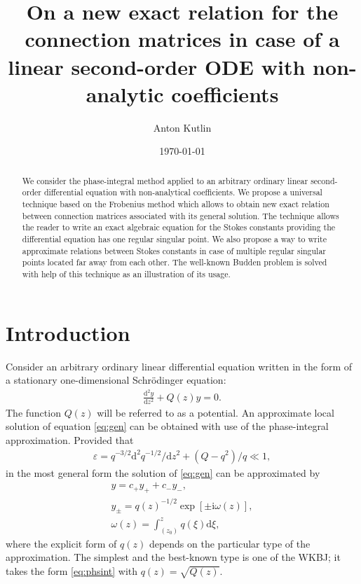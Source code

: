\documentclass[aip,jmp,reprint]{revtex4-1}
\def\rmi{\mathrm{i}}
\def\rmd{\mathrm{d}}
\def\w{\omega}
\newcommand\phsintgrnd[1][z]{q(#1)}
\newcommand\predexp[1][z]{q(#1)^{-1/2}}
\newcommand\phsintgrl[3][z]{\int_{#2}^{#3} \phsintgrnd[#1] \rmd #1}
\begin{document}
\title{On a new exact relation for the connection matrices in case of 
a linear second-order ODE with non-analytic coefficients}
\author{Anton Kutlin}

\date{\today}

\begin{abstract}
We consider the phase-integral method applied to an arbitrary ordinary linear second-order differential 
equation with non-analytical coefficients. We propose a universal technique based on the Frobenius method 
which allows to obtain new exact relation between connection matrices associated with its general solution.
The technique allows the reader to write an exact algebraic equation for the Stokes constants providing 
the differential equation has one regular singular point. We also propose a way to write approximate relations 
between Stokes constants in case of multiple regular singular points located far away from each other.
The well-known Budden problem is solved with help of this technique as an illustration of its usage.
\end{abstract}


\maketitle

\section{Introduction \label{sec:intro}}
Consider an arbitrary ordinary linear differential equation written in the form of 
a stationary one-dimensional Schr\"odinger equation:
\begin{eqnarray}
\frac{\rmd^2 y}{\rmd z^2} + Q(z)y = 0.   \label{eq:gen}
\end{eqnarray}
The function $Q(z)$ will be referred to as a potential. An approximate local solution 
of equation \eqref{eq:gen} can be obtained with use of the phase-integral approximation\cite{frbook}. 
Provided that 
\begin{eqnarray}
\varepsilon = q^{-3/2} \rmd^2 q^{-1/2}/\rmd z^2  + (Q - q^2)/q \ll 1,   \label{eq:cond}
\end{eqnarray}
in the most general form the solution of \eqref{eq:gen} can be approximated by
\begin{subequations}
\begin{eqnarray}
y = c_+y_+ + c_-y_-, \label{eq:gensol}
\\
y_\pm = \predexp \exp [\pm \rmi \w(z)], \label{eq:phsint}
\\
\w(z)=\phsintgrl[\xi]{(z_0)}{z}, \label{eq:phsintgrl}
\end{eqnarray}
\end{subequations}
where the explicit form of $q(z)$ depends on the particular type of the approximation.
The simplest and the best-known type is one of the WKBJ\cite{wkb1,wkb2,wkb3,wkbj}; 
it takes the form \eqref{eq:phsint} with $\phsintgrnd = \sqrt{Q(z)}$.
\end{document}
